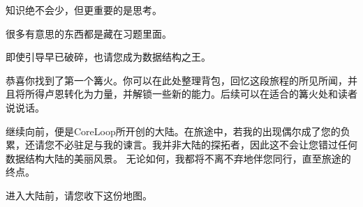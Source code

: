 \documentclass[twoside]{ctexbook}
\begin{document}
知识绝不会少，但更重要的是思考。

很多有意思的东西都是藏在习题里面。

即使引导早已破碎，也请您成为数据结构之王。

恭喜你找到了第一个篝火。你可以在此处整理背包，回忆这段旅程的所见所闻，并且将所得卢恩转化为力量，并解锁一些新的能力。后续可以在适合的篝火处和读者说说话。



继续向前，便是CoreLoop所开创的大陆。在旅途中，若我的出现偶尔成了您的负累，还请您不必驻足与我的谏言。我并非大陆的探拓者，因此这不会让您错过任何数据结构大陆的美丽风景。
无论如何，我都将不离不弃地伴您同行，直至旅途的终点。

进入大陆前，请您收下这份地图。

\tableofcontents    %

\mainmatter









\printanswers


\end{document}
